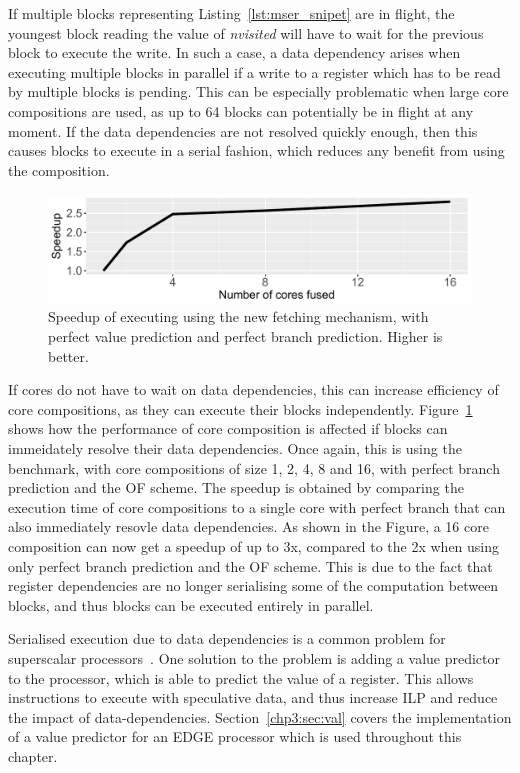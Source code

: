 If multiple blocks representing Listing~\ref{lst:mser_snipet} are in flight, the youngest block reading the value of \textit{nvisited} will have to wait for the previous block to execute the write.
In such a case, a data dependency arises when executing multiple blocks in parallel if a write to a register which has to be read by multiple blocks is pending.
This can be especially problematic when large core compositions are used, as up to 64 blocks can potentially be in flight at any moment.
If the data dependencies are not resolved quickly enough, then this causes blocks to execute in a serial fashion, which reduces any benefit from using the composition.

\begin{figure}[t]
    \centering
    \includegraphics[width=1\textwidth]{chapter3/graphics/mser_motiv_reg.pdf}
    \caption{Speedup of executing  using the new fetching mechanism, with perfect value prediction and perfect branch prediction. Higher is better.}
    \label{fig:motivation_reg}
	\vspace{1em}
\end{figure}

If cores do not have to wait on data dependencies, this can increase efficiency of core compositions, as they can execute their blocks independently.
Figure~\ref{fig:motivation_reg} shows how the performance of core composition is affected if blocks can immeidately resolve their data dependencies.
Once again, this is using the  benchmark, with core compositions of size 1, 2, 4, 8 and 16, with perfect branch prediction and the OF scheme.
The speedup is obtained by comparing the execution time of core compositions to a single core with perfect branch that can also immediately resovle data dependencies.
As shown in the Figure, a 16 core composition can now get a speedup of up to 3x, compared to the 2x when using only perfect branch prediction and the OF scheme.
This is due to the fact that register dependencies are no longer serialising some of the computation between blocks, and thus blocks can be executed entirely in parallel.

Serialised execution due to data dependencies is a common problem for superscalar processors~\cite{peraisVTAGE2014}.
One solution to the problem is adding a value predictor to the processor, which is able to predict the value of a register.
This allows instructions to execute with speculative data, and thus increase ILP and reduce the impact of data-dependencies.
Section~\ref{chp3:sec:val} covers the implementation of a value predictor for an EDGE processor which is used throughout this chapter.




